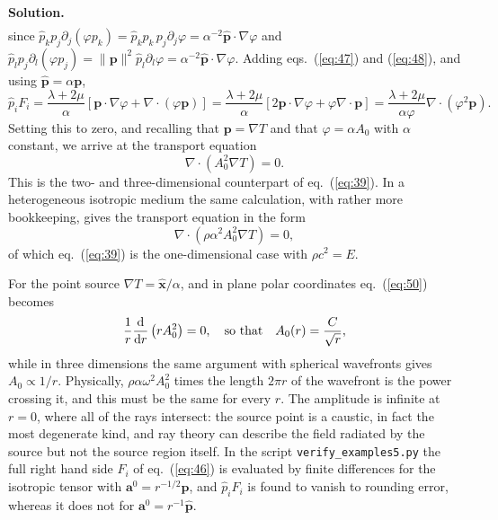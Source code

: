 \documentclass[a4paper,12pt]{paper}
\newcounter{example}
\newenvironment{solution}{\par\noindent\textbf{Solution.}\ }{\par\medskip}
\begin{document}
\begin{solution}
\begin{equation}
\begin{split}
\end{split}
\label{eq:48}
\end{equation}
since $\hat{p}_{k}p_{j}\partial_{j}(\varphi p_{k})=\hat{p}_{k}p_{k}\,p_{j}\partial_{j}\varphi=\alpha^{-2}\hat{\mathbf{p}}\cdot\nabla\varphi$
and $\hat{p}_{l}p_{j}\partial_{l}(\varphi p_{j})=\|\mathbf{p}\|^{2}\hat{p}_{l}\partial_{l}\varphi=\alpha^{-2}\hat{\mathbf{p}}\cdot\nabla\varphi$.
Adding eqs.~(\ref{eq:47}) and (\ref{eq:48}), and using $\hat{\mathbf{p}}=\alpha\mathbf{p}$,
\begin{equation}
\hat{p}_{i}F_{i}=\frac{\lambda+2\mu}{\alpha}\left[\mathbf{p}\cdot\nabla\varphi+\nabla\cdot(\varphi\mathbf{p})\right]
=\frac{\lambda+2\mu}{\alpha}\left[2\mathbf{p}\cdot\nabla\varphi+\varphi\nabla\cdot\mathbf{p}\right]
=\frac{\lambda+2\mu}{\alpha\varphi}\nabla\cdot\left(\varphi^{2}\mathbf{p}\right).
\label{eq:49}
\end{equation}
Setting this to zero, and recalling that $\mathbf{p}=\nabla T$ and that $\varphi=\alpha A_{0}$ with
$\alpha$ constant, we arrive at the transport equation
\begin{equation}
\nabla\cdot\left(A_{0}^{2}\nabla T\right)=0.
\label{eq:50}
\end{equation}
This is the two- and three-dimensional counterpart of eq.~(\ref{eq:39}). In a heterogeneous
isotropic medium the same calculation, with rather more bookkeeping, gives the transport
equation in the form
\begin{equation}
\nabla\cdot\left(\rho\alpha^{2}A_{0}^{2}\nabla T\right)=0,
\label{eq:51}
\end{equation}
of which eq.~(\ref{eq:39}) is the one-dimensional case with $\rho c^{2}=E$.

For the point source $\nabla T=\hat{\mathbf{x}}/\alpha$, and in plane polar coordinates
eq.~(\ref{eq:50}) becomes
\begin{equation}
\frac{1}{r}\frac{\mathrm{d}}{\mathrm{d} r}\left(rA_{0}^{2}\right)=0,\quad\text{so that}\quad
A_{0}(r)=\frac{C}{\sqrt{r}},
\label{eq:52}
\end{equation}
while in three dimensions the same argument with spherical wavefronts gives $A_{0}\propto1/r$.
Physically, $\rho\alpha\omega^{2}A_{0}^{2}$ times the length $2\pi r$ of the wavefront is the power
crossing it, and this must be the same for every $r$. The amplitude is infinite at $r=0$, where
all of the rays intersect: the source point is a caustic, in fact the most degenerate kind, and ray
theory can describe the field radiated by the source but not the source region itself. In the
script \texttt{verify\_examples5.py} the full right hand side $F_{i}$ of eq.~(\ref{eq:46}) is evaluated
by finite differences for the isotropic tensor with $\mathbf{a}^{0}=r^{-1/2}\hat{\mathbf{p}}$, and
$\hat{p}_{i}F_{i}$ is found to vanish to rounding error, whereas it does not for
$\mathbf{a}^{0}=r^{-1}\hat{\mathbf{p}}$.
\end{solution}
\end{document}
